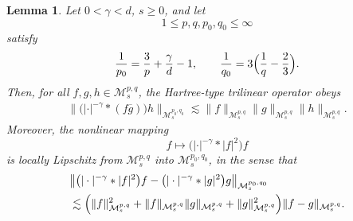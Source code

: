 \documentclass[12pt,reqno,a4paper]{amsart}
\numberwithin{equation}{section}
\theoremstyle{plain}
\newtheorem{lemma}[theorem]{Lemma}
\theoremstyle{definition}
\theoremstyle{remark}
\def\M{\mathcal{M}}
\def \M{{\mathcal M}}
\begin{document}
\begin{lemma}
\label{Trlnerlma}
Let $0<\gamma<d$, $s\geq 0$, and let
\[
1\leq p,q,p_{0},q_{0}\leq \infty
\]
satisfy
\[
\frac{1}{p_{0}}
=
\frac{3}{p}
+\frac{\gamma}{d}
-1,
\qquad
\frac{1}{q_{0}}
=
3\Bigl(\frac{1}{q}-\frac{2}{3}\Bigr).
\]
Then, for all $f,g,h\in \M^{p,q}_{s}$, the Hartree-type trilinear operator obeys
\begin{align}
\label{Trlnr1}
\bigl\|
\bigl(|\cdot|^{-\gamma}*(f\overline{g})\bigr)h
\bigr\|_{\M^{p_{0},q_{0}}_{s}}
\lesssim
\|f\|_{\M^{p,q}_{s}}
\|g\|_{\M^{p,q}_{s}}
\|h\|_{\M^{p,q}_{s}}.
\end{align}
Moreover, the nonlinear mapping
\[
f \mapsto \bigl(|\cdot|^{-\gamma}*|f|^{2}\bigr)f
\]
is locally Lipschitz from $\M^{p,q}_{s}$ into $\M^{p_{0},q_{0}}_{s}$, in the sense that
\begin{align}
\label{Trlnr2}
&
\bigl\|
\bigl(|\cdot|^{-\gamma}*|f|^{2}\bigr)f
-
\bigl(|\cdot|^{-\gamma}*|g|^{2}\bigr)g
\bigr\|_{\M^{p_{0},q_{0}}_{s}}
\nonumber\\
&\lesssim
\Bigl(
\|f\|_{\M^{p,q}_{s}}^{2}
+
\|f\|_{\M^{p,q}_{s}}
\|g\|_{\M^{p,q}_{s}}
+
\|g\|_{\M^{p,q}_{s}}^{2}
\Bigr)
\|f-g\|_{\M^{p,q}_{s}}.
\end{align}
\end{lemma}
\end{document}
